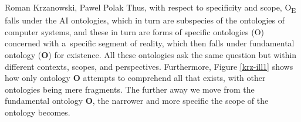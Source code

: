 \begin{artengenv2auth}{Roman Krzanowski, Pawel Polak}
Thus, with respect to specificity and scope, O\textsubscript{E} falls under the AI ontologies, which in turn are subspecies of the ontologies of computer systems, and these in turn are forms of specific ontologies (O) concerned with a~specific segment of reality, which then falls under fundamental ontology (\textbf{O}) for existence. All these ontologies ask the same question but within different contexts, scopes, and perspectives. Furthermore, Figure \ref{krz-ill1} shows how only ontology \textbf{O} attempts to comprehend all that exists, with other ontologies being mere fragments. The further away we move from the fundamental ontology \textbf{O}, the narrower and more specific the scope of the ontology becomes.






\end{artengenv2auth}
